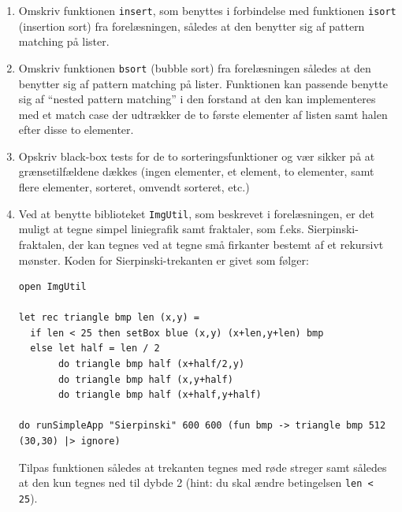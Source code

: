 \documentclass[a4paper,12pt]{article}
\begin{document}
\begin{enumerate}[label=7ø.\arabic*,start=0]
\item Omskriv funktionen \lstinline{insert}, som benyttes i forbindelse
  med funktionen \lstinline{isort} (insertion sort) fra forelæsningen,
  således at den benytter sig af pattern matching på lister.
\item Omskriv funktionen \texttt{bsort} (bubble sort) fra
  forelæsningen således at den benytter sig af pattern matching på
  lister. Funktionen kan passende benytte sig af ``nested pattern
  matching'' i den forstand at den kan implementeres med et match case
  der udtrækker de to første elementer af listen samt halen efter
  disse to elementer.
\item Opskriv black-box tests for de to sorteringsfunktioner og vær
  sikker på at grænsetilfældene dækkes (ingen elementer, et element,
  to elementer, samt flere elementer, sorteret, omvendt sorteret, etc.)

\item\label{sierpinski.ov} Ved at benytte biblioteket \texttt{ImgUtil}, som beskrevet i
  forelæsningen, er det muligt at tegne simpel liniegrafik samt
  fraktaler, som f.eks. Sierpinski-fraktalen, der kan tegnes ved at
  tegne små firkanter bestemt af et rekursivt mønster. Koden for
  Sierpinski-trekanten er givet som følger:

\begin{lstlisting}[numbers=none,frame=none,mathescape]
open ImgUtil

let rec triangle bmp len (x,y) =
  if len < 25 then setBox blue (x,y) (x+len,y+len) bmp
  else let half = len / 2
       do triangle bmp half (x+half/2,y)
       do triangle bmp half (x,y+half)
       do triangle bmp half (x+half,y+half)

do runSimpleApp "Sierpinski" 600 600 (fun bmp -> triangle bmp 512 (30,30) |> ignore)
\end{lstlisting}

Tilpas funktionen således at trekanten tegnes med røde streger samt
således at den kun tegnes ned til dybde 2 (hint: du skal ændre betingelsen \lstinline{len < 25}).


\end{enumerate}
\end{document}
